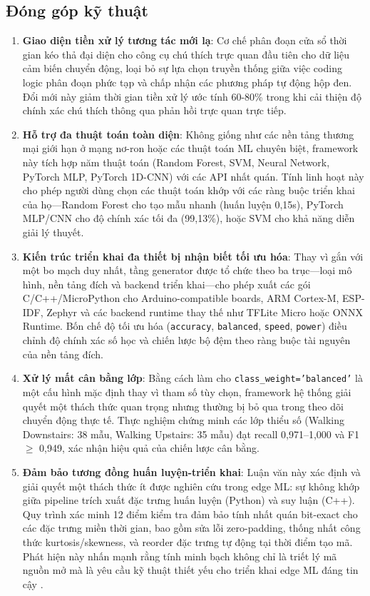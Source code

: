 \subsection{Đóng góp kỹ thuật}
\begin{enumerate}
    \item \textbf{Giao diện tiền xử lý tương tác mới lạ}: Cơ chế phân đoạn cửa sổ thời gian kéo thả đại diện cho công cụ chú thích trực quan đầu tiên cho dữ liệu cảm biến chuyển động, loại bỏ sự lựa chọn truyền thống giữa việc coding logic phân đoạn phức tạp và chấp nhận các phương pháp tự động hộp đen. Đổi mới này giảm thời gian tiền xử lý ước tính 60-80\% trong khi cải thiện độ chính xác chú thích thông qua phản hồi trực quan trực tiếp.

    \item \textbf{Hỗ trợ đa thuật toán toàn diện}: Không giống như các nền tảng thương mại giới hạn ở mạng nơ-ron hoặc các thuật toán ML chuyên biệt, framework này tích hợp năm thuật toán (Random Forest, SVM, Neural Network, PyTorch MLP, PyTorch 1D-CNN) với các API nhất quán. Tính linh hoạt này cho phép người dùng chọn các thuật toán khớp với các ràng buộc triển khai của họ---Random Forest cho tạo mẫu nhanh (huấn luyện 0,15s), PyTorch MLP/CNN cho độ chính xác tối đa (99,13\%), hoặc SVM cho khả năng diễn giải lý thuyết.

    \item \textbf{Kiến trúc triển khai đa thiết bị nhận biết tối ưu hóa}: Thay vì gắn với một bo mạch duy nhất, tầng generator được tổ chức theo ba trục---loại mô hình, nền tảng đích và backend triển khai---cho phép xuất các gói C/C++/MicroPython cho Arduino-compatible boards, ARM Cortex-M, ESP-IDF, Zephyr và các backend runtime thay thế như TFLite Micro hoặc ONNX Runtime. Bốn chế độ tối ưu hóa (\texttt{accuracy}, \texttt{balanced}, \texttt{speed}, \texttt{power}) điều chỉnh độ chính xác số học và chiến lược bộ đệm theo ràng buộc tài nguyên của nền tảng đích.

    \item \textbf{Xử lý mất cân bằng lớp}: Bằng cách làm cho \texttt{class\_weight='balanced'} là một cấu hình mặc định thay vì tham số tùy chọn, framework hệ thống giải quyết một thách thức quan trọng nhưng thường bị bỏ qua trong theo dõi chuyển động thực tế. Thực nghiệm chứng minh các lớp thiểu số (Walking Downstairs: 38 mẫu, Walking Upstairs: 35 mẫu) đạt recall 0,971--1,000 và F1 $\geq$ 0,949, xác nhận hiệu quả của chiến lược cân bằng.

    \item \textbf{Đảm bảo tương đồng huấn luyện-triển khai}: Luận văn này xác định và giải quyết một thách thức ít được nghiên cứu trong edge ML: sự không khớp giữa pipeline trích xuất đặc trưng huấn luyện (Python) và suy luận (C++). Quy trình xác minh 12 điểm kiểm tra đảm bảo tính nhất quán bit-exact cho các đặc trưng miền thời gian, bao gồm sửa lỗi zero-padding, thống nhất công thức kurtosis/skewness, và reorder đặc trưng tự động tại thời điểm tạo mã. Phát hiện này nhấn mạnh rằng tính minh bạch không chỉ là triết lý mã nguồn mở mà là yêu cầu kỹ thuật thiết yếu cho triển khai edge ML đáng tin cậy \cite{paleyes2022challenges}.


\end{enumerate}

